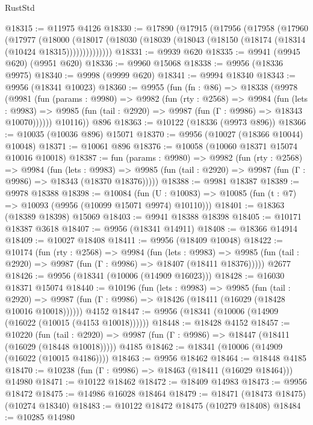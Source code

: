 \begin{lexlean}{RustStd}
\begin{coremodule}
@18315 := @11975 @4126
@18330 := @17890
    (@17915
      (@17956
        (@17958
          (@17960
            (@17977
              (@18000
                (@18017 (@18030 (@18039 (@18043 (@18150 (@18174 (@18314 (@10424 @18315))))))))))))))
@18331 := @9939 @620
@18335 := @9941 (@9945 @620) (@9951 @620)
@18336 := @9960 @15068
@18338 := @9956 (@18336 @9975)
@18340 := @9998 (@9999 @620)
@18341 := @9994 @18340
@18343 := @9956 (@18341 @10023)
@18360 := @9955
    (fun (fn : @86) =>
    @18338
      (@9978
        (@9981
          (fun (params : @9980) =>
          @9982
            (fun (rty : @2568) =>
            @9984
              (fun (lets : @9983) =>
              @9985 (fun (tail : @2920) => @9987 (fun (Γ : @9986) => @18343 @10070))))))
        @10116))
    @896
@18363 := @10122 (@18336 (@9973 @896))
@18366 := @10035 (@10036 @896) @15071
@18370 := @9956 (@10027 (@18366 @10044) @10048)
@18371 := @10061 @896
@18376 := @10058 (@10060 @18371 @15074 @10016 @10018)
@18387 := fun (params : @9980) =>
  @9982
    (fun (rty : @2568) =>
    @9984
      (fun (lets : @9983) =>
      @9985 (fun (tail : @2920) => @9987 (fun (Γ : @9986) => @18343 (@18370 @18376)))))
@18388 := @9981 @18387
@18389 := @9978 @18388
@18398 := @10084
    (fun (U : @10083) => @10085 (fun (t : @7) => @10093 (@9956 (@10099 @15071 @9974) @10110)))
@18401 := @18363 (@18389 @18398) @15069
@18403 := @9941 @18388 @18398
@18405 := @10171 @18387 @3618
@18407 := @9956 (@18341 @14911)
@18408 := @18366 @14914
@18409 := @10027 @18408
@18411 := @9956 (@18409 @10048)
@18422 := @10174
    (fun (rty : @2568) =>
    @9984
      (fun (lets : @9983) =>
      @9985 (fun (tail : @2920) => @9987 (fun (Γ : @9986) => @18407 (@18411 @18376)))))
    @2677
@18426 := @9956 (@18341 (@10006 (@14909 @16023)))
@18428 := @16030 @18371 @15074
@18440 := @10196
    (fun (lets : @9983) =>
    @9985
      (fun (tail : @2920) =>
      @9987 (fun (Γ : @9986) => @18426 (@18411 (@16029 (@18428 @10016 @10018))))))
    @4152
@18447 := @9956 (@18341 (@10006 (@14909 (@16022 (@10015 (@4153 @10018))))))
@18448 := @18428 @4152
@18457 := @10220
    (fun (tail : @2920) => @9987 (fun (Γ : @9986) => @18447 (@18411 (@16029 (@18448 @10018)))))
    @4185
@18462 := @18341 (@10006 (@14909 (@16022 (@10015 @4186))))
@18463 := @9956 @18462
@18464 := @18448 @4185
@18470 := @10238 (fun (Γ : @9986) => @18463 (@18411 (@16029 @18464))) @14980
@18471 := @10122 @18462
@18472 := @18409 @14983
@18473 := @9956 @18472
@18475 := @14986 @16028 @18464
@18479 := @18471 (@18473 @18475) (@10274 @18340)
@18483 := @10122 @18472 @18475 (@10279 @18408)
@18484 := @10285 @14980

\end{coremodule}
\end{lexlean}
